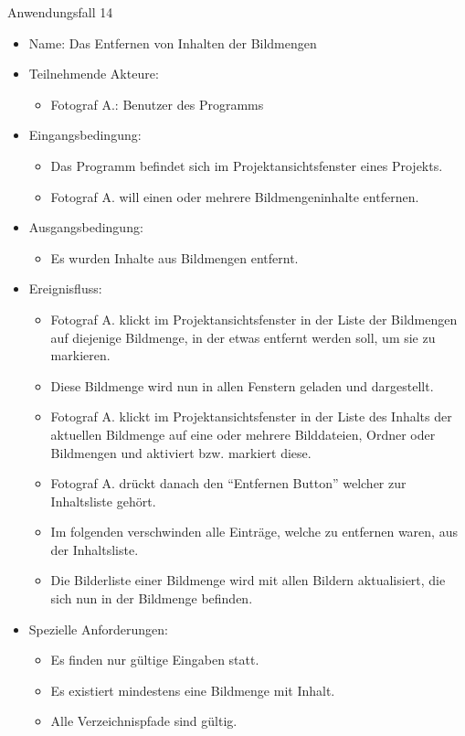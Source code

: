 	\begin{description}
		\item[Anwendungsfall 14]
	\end{description}
	
	\begin{itemize}
		\item Name: Das Entfernen von Inhalten der Bildmengen
		\item Teilnehmende Akteure:
		\begin{itemize}
			\item	Fotograf A.: Benutzer des Programms		
		\end{itemize}
		\item Eingangsbedingung:
		\begin{itemize}
			\item	Das Programm befindet sich im Projektansichtsfenster eines Projekts.
			\item Fotograf A. will einen oder mehrere Bildmengeninhalte entfernen.
		\end{itemize}
		\item Ausgangsbedingung:
		\begin{itemize}
			\item	Es wurden Inhalte aus Bildmengen entfernt.	
		\end{itemize}
		\item Ereignisfluss:
		\begin{itemize}
			\item Fotograf A. klickt im Projektansichtsfenster in der Liste der Bildmengen auf diejenige Bildmenge, in der etwas entfernt werden soll, um sie zu markieren.		
			\item Diese Bildmenge wird nun in allen Fenstern geladen und dargestellt.
			\item Fotograf A. klickt im Projektansichtsfenster in der Liste des Inhalts der aktuellen Bildmenge auf eine oder mehrere Bilddateien, Ordner oder Bildmengen und aktiviert bzw. markiert diese.
			\item Fotograf A. drückt danach den "`Entfernen Button"' welcher zur Inhaltsliste gehört.
			\item Im folgenden verschwinden alle Einträge, welche zu entfernen waren, aus der Inhaltsliste.
			\item Die Bilderliste einer Bildmenge wird mit allen Bildern aktualisiert, die sich nun in der Bildmenge befinden.
		\end{itemize}
		\item Spezielle Anforderungen:
		\begin{itemize}
			\item	Es finden nur gültige Eingaben statt.
			\item Es existiert mindestens eine Bildmenge mit Inhalt.
			\item Alle Verzeichnispfade sind gültig.
		\end{itemize}			
	\end{itemize}
	
